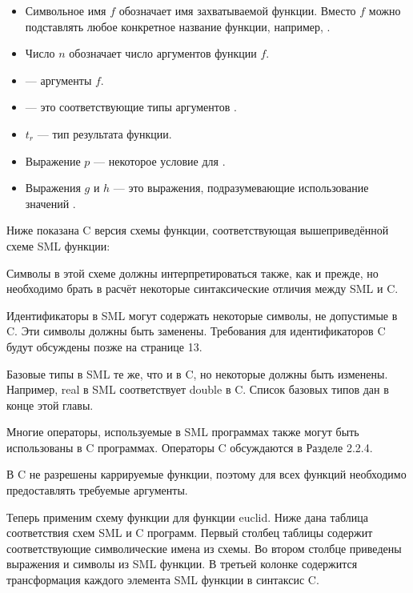 \begin{itemize}
\item{Символьное имя $f$ обозначает имя захватываемой функции. Вместо $f$ можно подставлять любое конкретное название функции, например, .}

\item{Число $n$ обозначает число аргументов функции $f$.}

\item{ --- аргументы $f$.}

\item{ --- это соответствующие типы аргументов .}

\item{$t_r$ --- тип результата функции.}

\item{Выражение $p$ --- некоторое условие для .}

\item{Выражения $g$ и $h$ --- это выражения, подразумевающие использование значений .}
\end{itemize}

Ниже показана C версия схемы функции, соответствующая вышеприведённой схеме SML функции:

Символы в этой схеме должны интерпретироваться также, как и прежде, но необходимо брать в расчёт некоторые синтаксические отличия между SML и C.

Идентификаторы в SML могут содержать некоторые символы, не допустимые в C. Эти символы должны быть заменены. Требования для идентификаторов C будут обсуждены позже на странице 13.

Базовые типы в SML те же, что и в C, но некоторые должны быть изменены. Например, real в SML соответствует double в C. Список базовых типов дан в конце этой главы.

Многие операторы, используемые в SML программах также могут быть использованы в C программах. Операторы C обсуждаются в Разделе 2.2.4.

В C не разрешены каррируемые функции, поэтому для всех функций необходимо предоставлять требуемые аргументы.

Теперь применим схему функции для функции euclid. Ниже дана таблица соответствия схем SML и C программ. Первый столбец таблицы содержит соответствующие символические имена из схемы. Во втором столбце приведены выражения и символы из SML функции. В третьей колонке содержится трансформация каждого элемента SML функции в синтаксис C.

